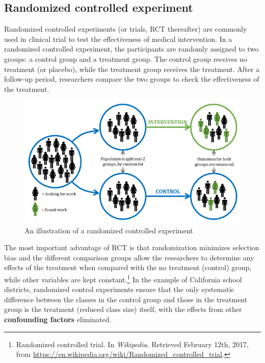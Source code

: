 \documentclass[a4paper,11pt]{article}
\begin{document}
\subsection*{Randomized controlled experiment}
\label{sec:orge591b01}

Randomized controlled experiments (or trials, RCT thereafter) are
commonly used in clinical trial to test the effectiveness of medical
intervention. In a randomized controlled experiment, the participants
are randomly assigned to two groups: a control group and a treatment
group. The control group receives no treatment (or placebo), while the
treatment group receives the treatment. After a follow-up period,
researchers compare the two groups to check the effectiveness of the
treatment.

\begin{figure}[htbp]
\centering
\includegraphics[width=1.0\textwidth]{figure/rct_example.png}
\caption{\label{fig:orgf7d64da}
An illustration of a randomized controlled experiment}
\end{figure}

The most important advantage of RCT is that randomization minimizes
selection bias and the different comparison groups allow the
researchers to determine any effects of the treatment when compared
with the no treatment (control) group, while other variables are kept
constant.\footnote{Randomized controlled trial. In \emph{Wikipedia}. Retrieved February
12th, 2017, from
\url{https://en.wikipedia.org/wiki/Randomized\_controlled\_trial}.} In the example of California school districts,
randomized control experiments ensure that the only systematic difference
between the classes in the control group and those in the treatment
group is the treatment (reduced class size) itself, with the effects
from other \textbf{confounding factors} eliminated. 
\end{document}
